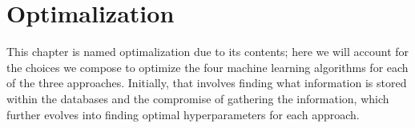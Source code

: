 \chapter{Optimalization}

This chapter is named optimalization due to its contents; here we will account for the choices we compose to optimize the four machine learning algorithms for each of the three approaches. Initially, that involves finding what information is stored within the databases and the compromise of gathering the information, which further evolves into finding optimal hyperparameters for each approach.

\begin{comment}
\section{Time of extraction and featurization}

The initial thought behind

\begin{table}[!ht]
\centering
\caption{}
\label{tab:timing-extraction}
\noindent\makebox[\textwidth]{
\begin{tabular}{M{3.0cm} M{4.0cm} M{4.0cm}}
  \hline
  \hline
  Database & Extraction period & Estimated time usage  \\
  \hline
  Materials Project & December $2020$ & $5$ min \\
  Citrine Informatics & December $2020$ & $2$ min  \\
  OQMD & December $2020$ & $3$ min \\
  AFLOW & January $2020$ - February $2021$ & $17$ days \\
  AFLOW-ML & January $2020$ - February $2021$ & $16$ days \\
  JARVIS-DFT & January $2020$ & $5$ min \\
  \hline
  \hline
\end{tabular}
}
\end{table}

\end{comment}
